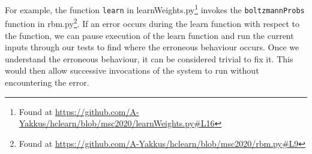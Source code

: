 For example, the function \verb|learn| in learnWeights.py\footnote{Found at \url{https://github.com/A-Yakkus/hclearn/blob/msc2020/learnWeights.py\#L16}} invokes the \verb|boltzmannProbs| function in rbm.py\footnote{Found at \url{https://github.com/A-Yakkus/hclearn/blob/msc2020/rbm.py\#L9}}.
If an error occurs during the learn function with respect to the  function, we can pause execution of the learn function and run the current inputs through our tests to find where the erroneous behaviour occurs.
Once we understand the erroneous behaviour, it can be considered trivial to fix it.
This would then allow successive invocations of the system to run without encountering the error. 


